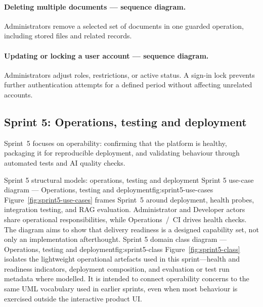 \paragraph{Deleting multiple documents --- sequence diagram.}
Administrators remove a selected set of documents in one guarded operation,
including stored files and related records.

\paragraph{Updating or locking a user account --- sequence diagram.}
Administrators adjust roles, restrictions, or active status. A sign-in lock
prevents further authentication attempts for a defined period without affecting
unrelated accounts.

\subsection{Sprint 5: Operations, testing and deployment}\label{subsec:sprint5-design}

Sprint~5 focuses on operability: confirming that the platform is healthy,
packaging it for reproducible deployment, and validating behaviour through
automated tests and AI quality checks.

%
  {Sprint 5 structural models: operations, testing and deployment}%
  {Sprint 5 use-case diagram — Operations, testing and deployment}{fig:sprint5-use-cases}%
  {Figure~\ref{fig:sprint5-use-cases} frames Sprint~5 around deployment,
  health probes, integration testing, and RAG evaluation. Administrator and
  Developer actors share operational responsibilities, while Operations~/~CI
  drives health checks. The diagram aims to show that delivery readiness is a
  designed capability set, not only an implementation afterthought.}%
  {Sprint 5 domain class diagram — Operations, testing and deployment}{fig:sprint5-class}%
  {Figure~\ref{fig:sprint5-class} isolates the lightweight operational artefacts
  used in this sprint---health and readiness indicators, deployment composition,
  and evaluation or test run metadata where modelled. It is intended to connect
  operability concerns to the same UML vocabulary used in earlier sprints,
  even when most behaviour is exercised outside the interactive product UI.}%

